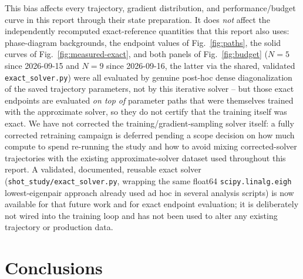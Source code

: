 \documentclass[11pt]{article}
\begin{document}
This bias affects every trajectory, gradient distribution, and performance/budget
curve in this report through their state preparation.  It does \emph{not} affect the
independently recomputed exact-reference quantities that this report also uses:
phase-diagram backgrounds, the endpoint values of Fig.~\ref{fig:paths}, the solid
curves of Fig.~\ref{fig:measured-exact}, and both panels of Fig.~\ref{fig:budget}
($N=5$ since 2026-09-15 and $N=9$ since 2026-09-16, the latter via the shared,
validated \texttt{exact\_solver.py})
were all evaluated by genuine post-hoc dense diagonalization of the saved trajectory
parameters, not by this iterative solver -- but those exact endpoints are evaluated
\emph{on top of} parameter paths that were themselves trained with the approximate
solver, so they do not certify that the training itself was exact.  We have not
corrected the training/gradient-sampling solver itself: a fully corrected retraining
campaign is deferred pending a scope decision on how much compute to spend re-running
the study and how to avoid mixing corrected-solver trajectories with the existing
approximate-solver dataset used throughout this report.  A validated, documented,
reusable exact solver (\texttt{shot\_study/exact\_solver.py}, wrapping the same
float64 \texttt{scipy.linalg.eigh} lowest-eigenpair approach already used ad hoc in
several analysis scripts) is now available for that future work and for exact
endpoint evaluation; it is deliberately not wired into the training loop and has not
been used to alter any existing trajectory or production data.

\section{Conclusions}
\end{document}
